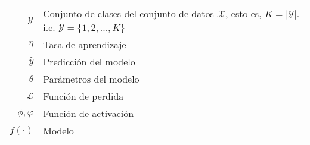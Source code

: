 \begin{table}[H]
\begin{center}
\begin{tabularx}{\textwidth}{|r|X|}
            $ \mathcal{Y} $                                                                  & Conjunto de clases del conjunto de datos $\mathcal{X}$, esto es, $\textit{K} = \lvert \mathcal{Y} \rvert$. \newline i.e. \scriptsize{${ \mathcal{Y} = \{1,2,...,\textit{K}\}}$} \\
            $ \eta $                                                                         & Tasa de aprendizaje                                                                                                                                                             \\
            $ \hat{y} $                                                                      & Predicción del modelo                                                                                                                                                           \\
            $ \theta $                                                                       & Parámetros del modelo                                                                                                                                                           \\
            $ \mathcal{L} $                                                                  & Función de perdida                                                                                                                                                              \\
            $ \phi ,\varphi $                                                                & Función de activación                                                                                                                                                           \\
            $ f\left(\cdot\right) $                                                          & Modelo                                                                                                                                                                          \\

\end{tabularx}
\end{center}
\end{table}
